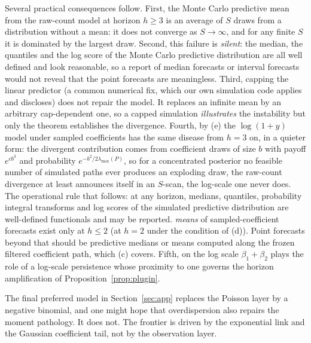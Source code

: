 \documentclass[12pt]{article}
\theoremstyle{plain}
\theoremstyle{definition}
\theoremstyle{remark}
\begin{document}
Several practical consequences follow. First, the Monte Carlo predictive mean from the raw-count model at horizon $h\ge3$ is an average of $S$ draws from a distribution without a mean: it does not converge as $S\to\infty$, and for any finite $S$ it is dominated by the largest draw. Second, this failure is \emph{silent}: the median, the quantiles and the log score of the Monte Carlo predictive distribution are all well defined and look reasonable, so a report of median forecasts or interval forecasts would not reveal that the point forecasts are meaningless. Third, capping the linear predictor (a common numerical fix, which our own simulation code applies and discloses) does not repair the model. It replaces an infinite mean by an arbitrary cap-dependent one, so a capped simulation \emph{illustrates} the instability but only the theorem establishes the divergence. Fourth, by (e) the $\log(1+y)$ model under sampled coefficients has the same disease from $h=3$ on, in a quieter form: the divergent contribution comes from coefficient draws of size $b$ with payoff $e^{cb^3}$ and probability $e^{-b^2/2\lambda_{\max}(P)}$, so for a concentrated posterior no feasible number of simulated paths ever produces an exploding draw, the raw-count divergence at least announces itself in an $S$-scan, the log-scale one never does. The operational rule that follows: at any horizon, medians, quantiles, probability integral transforms and log scores of the simulated predictive distribution are well-defined functionals and may be reported. \emph{means} of sampled-coefficient forecasts exist only at $h\le2$ (at $h=2$ under the condition of (d)). Point forecasts beyond that should be predictive medians or means computed along the frozen filtered coefficient path, which (c) covers. Fifth, on the log scale $\beta_1+\beta_2$ plays the role of a log-scale persistence whose proximity to one governs the horizon amplification of Proposition~\ref{prop:plugin}.

The final preferred model in Section~\ref{sec:app} replaces the Poisson layer by a negative binomial, and one might hope that overdispersion also repairs the moment pathology. It does not. The frontier is driven by the exponential link and the Gaussian coefficient tail, not by the observation layer.
\end{document}
